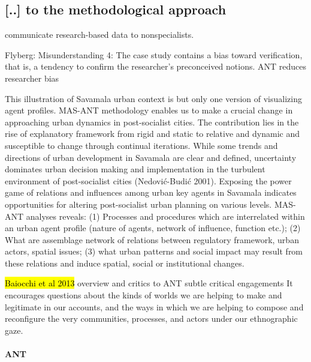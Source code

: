 \documentclass[11pt]{report}
\begin{document}
\subsection{[..] to the methodological approach}

communicate research-based data to nonspecialists.

Flyberg: 
Misunderstanding 4: The case study contains a bias toward verification, that is, a tendency to confirm the researcher's preconceived notions.
ANT reduces researcher bias

This illustration of Savamala urban context is but only one version of visualizing agent profiles. MAS-ANT methodology enables us to make a crucial change in approaching urban dynamics in post-socialist cities. The contribution lies in the rise of explanatory framework from rigid and static to relative and dynamic and susceptible to change through continual iterations. While some trends and directions of urban development in Savamala are clear and defined, uncertainty dominates urban decision making and implementation in the turbulent environment of post-socialist cities (Nedović-Budić 2001). Exposing the power game of relations and influences among urban key agents in Savamala indicates opportunities for altering post-socialist urban planning on various levels. MAS-ANT analyses reveals: 
(1)	Processes and procedures which are interrelated within an urban agent profile (nature of agents, network of influence, function etc.);
(2)	What are assemblage network of relations between regulatory framework, urban actors, spatial issues;
(3)	what  urban  patterns  and  social  impact  may result  from  these  relations  and  induce  spatial,  social  or institutional changes.

\hl{Baiocchi et al 2013}
overview and critics to ANT
subtle critical engagements
It encourages questions about the kinds of worlds we are helping to make and legitimate in our accounts, and the ways in which we are helping to compose and reconfigure the very communities, processes, and actors under our ethnographic gaze. 

\paragraph{ANT}
 
\end{document}

